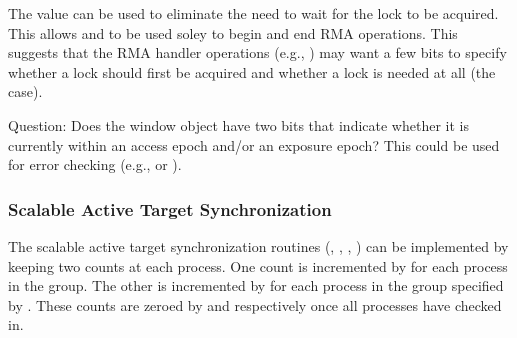 \documentclass{article}
\begin{document}

The  value  can be used to eliminate
the need to wait for the lock to be acquired.  This allows
 and  to be used soley to begin
and end RMA operations.  This suggests that the RMA handler operations
(e.g., ) may want a few bits to specify
whether a lock should first be acquired and whether a lock is needed
at all (the  case).  

Question: Does the window object have two bits that indicate whether it is
currently within an access epoch and/or an exposure epoch?  This could be used
for error checking (e.g.,  or
).

\subsubsection{Scalable Active Target Synchronization}
The scalable active target synchronization routines (,
, , )
can be implemented by keeping two counts at each process.  One count is
incremented by  for each process in the group.  
The other is incremented by  for each process in the
group specified by .  These counts are zeroed by
 and  respectively once all
processes have checked in.
\end{document}
